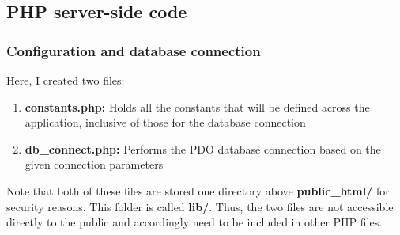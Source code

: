 \documentclass[12pt]{article}
\begin{document}
\subsection{PHP server-side code}
\subsubsection{Configuration and database connection}
Here, I created two files:
\begin{enumerate}
\item{\textbf{constants.php:}} Holds all the constants that will be defined across the application, inclusive of those for the database connection
\item{\textbf{db\_connect.php:}} Performs the PDO database connection based on the given connection parameters
\end{enumerate}
Note that both of these files are stored one directory above \textbf{public\_html/} for security reasons. This folder is called \textbf{lib/}. Thus, the two files are not accessible directly to the public and accordingly need to be included in other PHP files.
\end{document}
